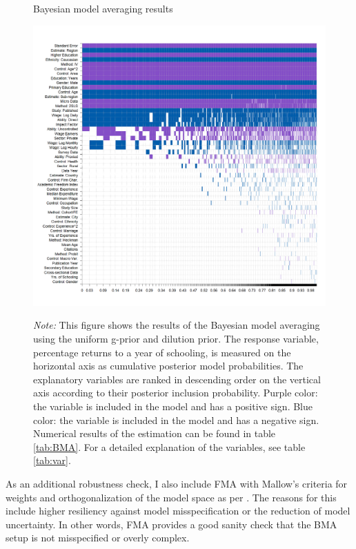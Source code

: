 \begin{figure}[!t]
\begin{center}
\caption{Bayesian model averaging results}
\label{fig:BMA}
\includegraphics[width=1\textwidth]{Figures/bma_UIP_dilut_results.png}
\end{center}\vspace{-0.5cm}
\captionsetup{width=0.95\textwidth, font = scriptsize}
\caption*{\emph{Note:} This figure shows the results of the Bayesian model averaging using the uniform g-prior and dilution prior. The response variable, percentage returns to a year of schooling, is measured on the horizontal axis as cumulative posterior model probabilities. The explanatory variables are ranked in descending order on the vertical axis according to their posterior inclusion probability. Purple color: the variable is included in the model and has a positive sign. Blue color: the variable is included in the model and has a negative sign. Numerical results of the estimation can be found in table \ref{tab:BMA}. For a detailed explanation of the variables, see table \ref{tab:var}.
}
\end{figure}

As an additional robustness check, I also include \ac{FMA} with Mallow's criteria for weights \citep{hansen2007least} and orthogonalization of the model space as per \cite{amini2012comparison}. The reasons for this include higher resiliency against model misspecification or the reduction of model uncertainty. In other words, \ac{FMA} provides a good sanity check that the \ac{BMA} setup is not misspecified or overly complex.

